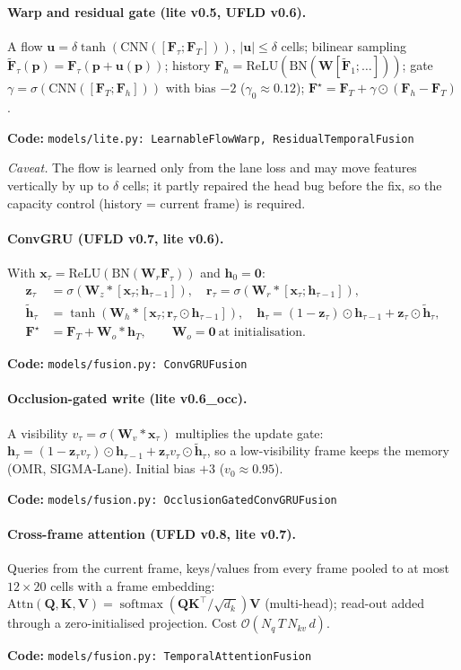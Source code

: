 \documentclass[10pt,a4paper]{article}
\newcommand{\impl}[1]{\par\noindent\textcolor{blue!50!black}{\small\textbf{Code:} \texttt{#1}}\par}
\newcommand{\softmax}{\operatorname{softmax}}
\theoremstyle{definition}
\begin{document}
\paragraph{Warp and residual gate (lite v0.5, UFLD v0.6).} A flow $\bm u=\delta\tanh(\mathrm{CNN}([\bm F_\tau;\bm F_T]))$,
$|\bm u|\le\delta$ cells; bilinear sampling $\tilde{\bm F}_\tau(\bm p)=\bm F_\tau(\bm p+\bm u(\bm p))$; history
$\bm F_h=\mathrm{ReLU}(\mathrm{BN}(\bm W[\tilde{\bm F}_1;\dots]))$; gate $\gamma=\sigma(\mathrm{CNN}([\bm F_T;\bm F_h]))$ with
bias $-2$ ($\gamma_0\approx0.12$); $\bm F^\star=\bm F_T+\gamma\odot(\bm F_h-\bm F_T)$.
\impl{models/lite.py: LearnableFlowWarp, ResidualTemporalFusion}
\emph{Caveat.} The flow is learned only from the lane loss and may move features vertically by up to $\delta$ cells;
it partly repaired the head bug before the fix, so the capacity control (history = current frame) is required.

\paragraph{ConvGRU (UFLD v0.7, lite v0.6).} With $\bm x_\tau=\mathrm{ReLU}(\mathrm{BN}(\bm W_r\bm F_\tau))$ and
$\bm h_0=\bm 0$:
\begin{align}
\bm z_\tau&=\sigma(\bm W_z*[\bm x_\tau;\bm h_{\tau-1}]),\quad \bm r_\tau=\sigma(\bm W_r*[\bm x_\tau;\bm h_{\tau-1}]),\\
\tilde{\bm h}_\tau&=\tanh(\bm W_h*[\bm x_\tau;\bm r_\tau\odot\bm h_{\tau-1}]),\quad
\bm h_\tau=(1-\bm z_\tau)\odot\bm h_{\tau-1}+\bm z_\tau\odot\tilde{\bm h}_\tau,\\
\bm F^\star&=\bm F_T+\bm W_o*\bm h_T,\qquad \bm W_o=\bm 0\ \text{at initialisation}.
\end{align}
\impl{models/fusion.py: ConvGRUFusion}

\paragraph{Occlusion-gated write (lite v0.6\_occ).} A visibility $v_\tau=\sigma(\bm W_v*\bm x_\tau)$ multiplies the update
gate: $\bm h_\tau=(1-\bm z_\tau v_\tau)\odot\bm h_{\tau-1}+\bm z_\tau v_\tau\odot\tilde{\bm h}_\tau$, so a low-visibility frame
keeps the memory (OMR, SIGMA-Lane). Initial bias $+3$ ($v_0\approx0.95$). \impl{models/fusion.py: OcclusionGatedConvGRUFusion}

\paragraph{Cross-frame attention (UFLD v0.8, lite v0.7).} Queries from the current frame, keys/values from every frame
pooled to at most $12{\times}20$ cells with a frame embedding:
$\mathrm{Attn}(\bm Q,\bm K,\bm V)=\softmax(\bm Q\bm K^\top/\sqrt{d_k})\bm V$ (multi-head); read-out added through a
zero-initialised projection. Cost $\mathcal O(N_q\,T\,N_{kv}\,d)$. \impl{models/fusion.py: TemporalAttentionFusion}
\end{document}
